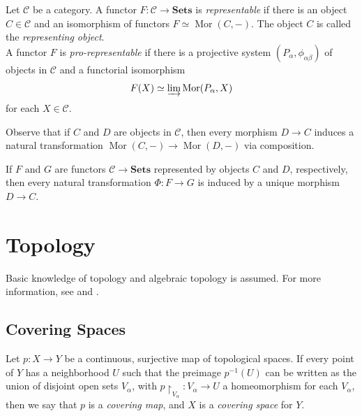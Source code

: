 \documentclass[11pt,openany]{book} %
\begin{document}
\begin{definition}
Let $\mathcal{C}$ be a category. A functor $F : \mathcal{C} \to \mathbf{Sets}$ is \emph{representable} if there is an object $C \in \mathcal{C}$ and an isomorphism of functors $F \simeq \operatorname{Mor}(C,-)$. The object $C$ is called the \emph{representing object}.\\

A functor $F$ is \emph{pro-representable} if there is a projective system $(P_{\alpha}, \phi_{\alpha\beta})$ of objects in $\mathcal{C}$ and a functorial isomorphism
\[
F(X) \simeq \varinjlim \operatorname{Mor}(P_{\alpha},X)
\]
for each $X \in \mathcal{C}$.
\end{definition}

Observe that if $C$ and $D$ are objects in $\mathcal{C}$, then every morphism $D \to C$ induces a natural transformation $\operatorname{Mor}(C, -) \to \operatorname{Mor}(D, -)$ via composition.\\

\begin{lemma}[Yoneda]
If $F$ and $G$ are functors $\mathcal{C} \to \mathbf{Sets}$ represented by objects $C$ and $D$, respectively, then every natural transformation $\Phi : F \to G$ is induced by a unique morphism $D \to C$.
\end{lemma}


\section{Topology}

Basic knowledge of topology and algebraic topology is assumed. For more information, see \cite{munkres} and \cite{massey}.


\subsection{Covering Spaces}
\begin{definition}
Let $p : X \to Y$ be a continuous, surjective map of topological spaces. If every point of $Y$ has a neighborhood $U$ such that the preimage $p^{-1}(U)$ can be written as the union of disjoint open sets $V_{\alpha}$, with $p\restriction_{V_{\alpha}} : V_{\alpha} \to U$ a homeomorphism for each $V_{\alpha}$, then we say that $p$ is a \emph{covering map}, and $X$ is a \emph{covering space} for $Y$.
\end{definition}
\end{document}
